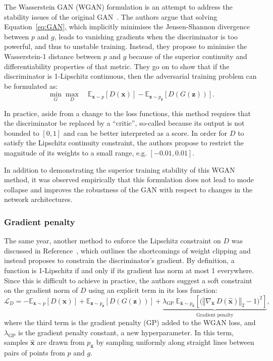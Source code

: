 The Wasserstein GAN (WGAN) formulation is an attempt to address the stability
issues of the original GAN~\cite{arjovsky2017wasserstein}. The authors argue
that solving Equation~\ref{eq:GAN}, which implicitly minimises the Jensen-Shannon
divergence between $p$ and $g$, leads to vanishing gradients when the
discriminator is too powerful, and thus to unstable training. Instead, they
propose to minimise the Wasserstein-1 distance between $p$ and $g$ because of
the superior continuity and differentiability properties of that metric. They go on to show
that if the discriminator is 1-Lipschitz continuous, then the adversarial
training problem can be formulated as:
\begin{equation}
    \min_G \max_D \quad
    \mathbb{E}_{\bm{x} \sim p} \left[ D(\bm{x}) \right] -
    \mathbb{E}_{\bm{z} \sim p_{\bm{z}}} \left[ D(G(\bm{z})) \right].
\end{equation}

In practice, aside from a change to the loss functions, this method requires
that the discriminator be replaced by a ``critic'', so-called because its output
is not bounded to $[0, 1]$ and can be better interpreted as a score. In order
for $D$ to satisfy the Lipschitz continuity constraint, the authors propose to
restrict the magnitude of its weights to a small range, e.g. $[-0.01, 0.01]$.

In addition to demonstrating the superior training stability of this WGAN
method, it was observed empirically that this formulation does not lead to mode
collapse and improves the robustness of the GAN with respect to changes in the
network architectures.

\subsubsection{Gradient penalty}
The same year, another method to enforce the Lipschitz constraint on $D$ was
discussed in Reference~\cite{NIPS2017_892c3b1c}, which outlines the shortcomings of weight
clipping and instead proposes to constrain the discriminator's gradient. By
definition, a function is 1-Lipschitz if and only if its gradient has norm at
most 1 everywhere. Since this is difficult to achieve in practice, the authors
suggest a soft constraint on the gradient norm of $D$ using an explicit term in
its loss function:
\begin{equation}\label{eq:WGAN-GP}
    \mathcal{L}_D =
    -\mathbb{E}_{\bm{x} \sim p} \left[ D(\bm{x}) \right] +
    \mathbb{E}_{\bm{z} \sim p_{\bm{z}}} \left[ D(G(\bm{z})) \right] +
    \underbrace{\lambda_\mathrm{GP}\ \mathbb{E}_{\hat{\bm{x}} \sim p_{\hat{\bm{x}}}}
    \left[ \big( \left\Vert \nabla_{\hat{\bm{x}}}\ D(\hat{\bm{x}}) \right\Vert_2 - 1 \big) ^2 \right]}_\textrm{Gradient penalty},
\end{equation}
where the third term is the gradient penalty (GP) added to the WGAN loss, and
$\lambda_\mathrm{GP}$ is the gradient penalty constant, a new hyperparameter. In
this term, samples $\hat{\bm{x}}$ are drawn from $p_{\hat{\bm{x}}}$ by
sampling uniformly along straight lines between pairs of points from $p$ and
$g$.

